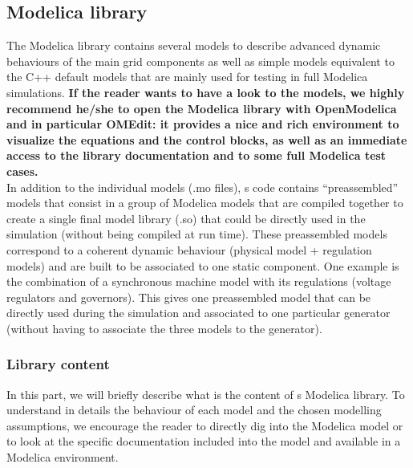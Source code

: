 \documentclass[a4paper, 12pt]{report}
\begin{document}
\subsection{Modelica library}

The \Dynawo Modelica library contains several models to describe advanced dynamic behaviours of the main grid components as well as simple models equivalent to the C++ default models that are mainly used for testing in full Modelica simulations. \textbf{If the reader wants to have a look to the models, we highly recommend he/she to open the \Dynawo Modelica library with OpenModelica and in particular OMEdit: it provides a nice and rich environment to visualize the equations and the control blocks, as well as an immediate access to the library documentation and to some full Modelica test cases. } \\

In addition to the individual models (.mo files), \Dynawo\textquotesingle s code contains ``preassembled'' models that consist in a group of Modelica models that are compiled together to create a single final model library (.so) that could be directly used in the simulation (without being compiled at run time). These preassembled models correspond to a coherent dynamic behaviour (physical model + regulation models) and are built to be associated to one static component. One example is the combination of a synchronous machine model with its regulations (voltage regulators and governors). This gives one preassembled model that can be directly used during the simulation and associated to one particular generator (without having to associate the three models to the generator).

\subsubsection{Library content}

In this part, we will briefly describe what is the content of \Dynawo\textquotesingle s Modelica library. To understand in details the behaviour of each model and the chosen modelling assumptions, we encourage the reader to directly dig into the Modelica  model or to look at the specific documentation included into the model and available in a Modelica environment.\\
\end{document}
